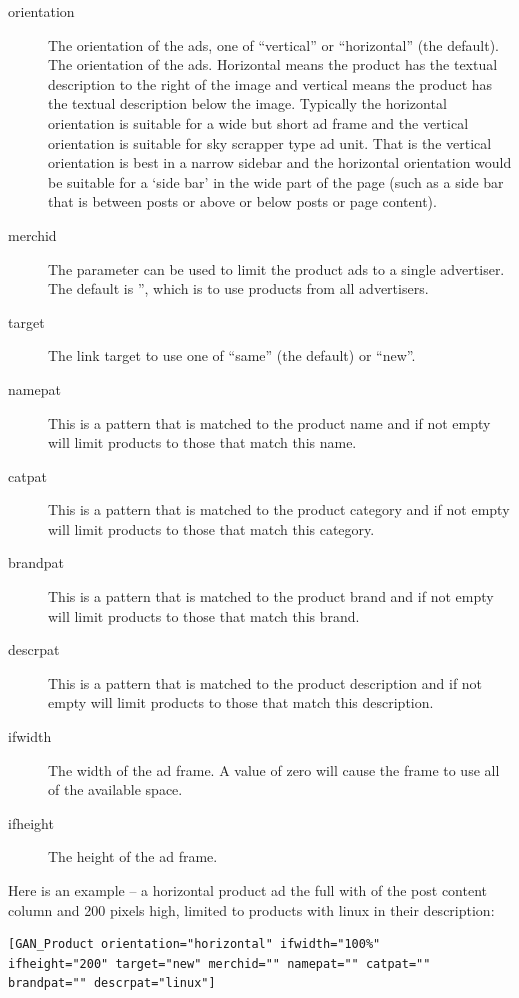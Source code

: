 \documentclass[letterpaper]{article}
\begin{document}
\begin{description}
  \item[orientation] The orientation of the ads, one of ``vertical'' or
``horizontal'' (the default). The orientation of the ads. Horizontal
means the product has the textual description to the right of the image
and vertical means the product has the textual description below the
image. Typically the horizontal orientation is suitable for a wide but
short ad frame and the vertical orientation is suitable for sky
scrapper type ad unit.  That is the vertical orientation is best in a
narrow sidebar and the horizontal orientation would be suitable for a
`side bar' in the wide part of the page (such as a side bar that is
between posts or above or below posts or page content).
  \item[merchid] The parameter can be used to limit the product ads to
a single advertiser.  The default is '', which is to use products from all
advertisers.
  \item[target] The link target to use one of ``same'' (the
default) or ``new''.
  \item[namepat] This is a pattern that is matched to the product
name and if not empty will limit products to those that match this name.
  \item[catpat] This is a pattern that is matched to the
product category and if not empty will limit products to those that
match this category.
  \item[brandpat] This is a pattern that is matched to the product
brand and if not empty will limit products to those that match this brand.
  \item[descrpat] This is a pattern that is matched to the
product description and if not empty will limit products to those that
match this description.
  \item[ifwidth] The width of the ad frame. A value
of zero will cause the frame to use all of the available space.
  \item[ifheight] The height of the ad frame.
\end{description}

Here is an example -- a horizontal product ad the full with of the post
content column and 200 pixels high, limited to products with linux in
their description:
\begin{verbatim}
[GAN_Product orientation="horizontal" ifwidth="100%" 
ifheight="200" target="new" merchid="" namepat="" catpat="" 
brandpat="" descrpat="linux"]
\end{verbatim}
\end{document}
